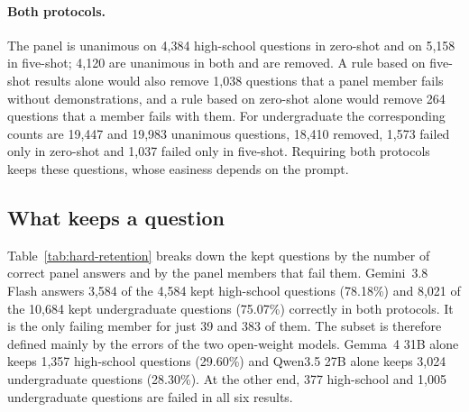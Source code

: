 \paragraph{Both protocols.} The panel is unanimous on 4,384 high-school
questions in zero-shot and on 5,158 in five-shot; 4,120 are unanimous in
both and are removed. A rule based on five-shot results alone would also
remove 1,038 questions that a panel member fails without demonstrations, and
a rule based on zero-shot alone would remove 264 questions that a member
fails with them. For undergraduate the corresponding counts are 19,447 and
19,983 unanimous questions, 18,410 removed, 1,573 failed only in zero-shot
and 1,037 failed only in five-shot. Requiring both protocols keeps these
questions, whose easiness depends on the prompt.

\subsection{What keeps a question}
\label{app:hard-retention}

Table~\ref{tab:hard-retention} breaks down the kept questions by the number of
correct panel answers and by the panel members that fail them. Gemini~3.8
Flash answers 3,584 of the 4,584 kept high-school questions (78.18\%) and
8,021 of the 10,684 kept undergraduate questions (75.07\%) correctly in both
protocols. It is the only failing member for just 39 and 383 of them. The
subset is therefore defined mainly by the errors of the two open-weight
models. Gemma~4 31B alone keeps 1,357 high-school questions (29.60\%) and
Qwen3.5 27B alone keeps 3,024 undergraduate questions (28.30\%). At the other
end, 377 high-school and 1,005 undergraduate questions are failed in all six
results.

